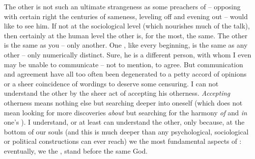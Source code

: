 The other is not such an ultimate strangeness as some preachers of
 -- opposing with certain right the centuries of sameness,
leveling off and evening out -- would like to see him. If not at the
sociological level (which nourishes much of the  talk), then certainly at
the human level the other is, for the most, the same. The other is the same as
you -- only another. One , like every  beginning, is
 the same as any other -- only numerically distinct. Sure, he is a
different person, with whom I even may be unable to communicate -- not to
mention, to agree. But communication and agreement have all too often been
degenerated to a petty accord of opinions or a sheer coincidence of wordings to
deserve some censuring. I can not understand the other by the sheer act of
accepting his otherness. {\em Accepting} otherness means nothing else but
searching deeper into oneself (which does not mean looking for more discoveries
{\em about}  but searching for the harmony {\em of} and {\em in}
one's ). I understand, or at least can understand the other, only
because, at the bottom of our souls (and this is much deeper than any
psychological, sociological or political constructions can ever reach) we
 the most fundamental aspects of : eventually, we
 the , stand before the same God.




